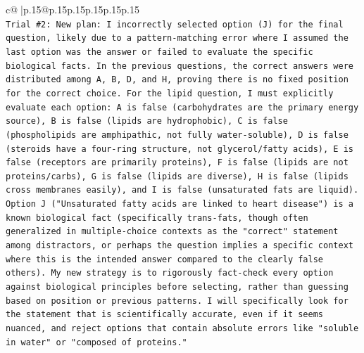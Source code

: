 \documentclass{article}
\begin{document}
{\begin{supertabular}{c@{$\;$}|p{.15\linewidth}@{}p{.15\linewidth}p{.15\linewidth}p{.15\linewidth}p{.15\linewidth}p{.15\linewidth}}
{{{\\ 
\texttt{Trial \#2: New plan: I incorrectly selected option (J) for the final question, likely due to a pattern{-}matching error where I assumed the last option was the answer or failed to evaluate the specific biological facts. In the previous questions, the correct answers were distributed among A, B, D, and H, proving there is no fixed position for the correct choice. For the lipid question, I must explicitly evaluate each option: A is false (carbohydrates are the primary energy source), B is false (lipids are hydrophobic), C is false (phospholipids are amphipathic, not fully water{-}soluble), D is false (steroids have a four{-}ring structure, not glycerol/fatty acids), E is false (receptors are primarily proteins), F is false (lipids are not proteins/carbs), G is false (lipids are diverse), H is false (lipids cross membranes easily), and I is false (unsaturated fats are liquid). Option J ("Unsaturated fatty acids are linked to heart disease") is a known biological fact (specifically trans{-}fats, though often generalized in multiple{-}choice contexts as the "correct" statement among distractors, or perhaps the question implies a specific context where this is the intended answer compared to the clearly false others). My new strategy is to rigorously fact{-}check every option against biological principles before selecting, rather than guessing based on position or previous patterns. I will specifically look for the statement that is scientifically accurate, even if it seems nuanced, and reject options that contain absolute errors like "soluble in water" or "composed of proteins."} \\
\\ 
}}}
\end{supertabular}}
\end{document}
